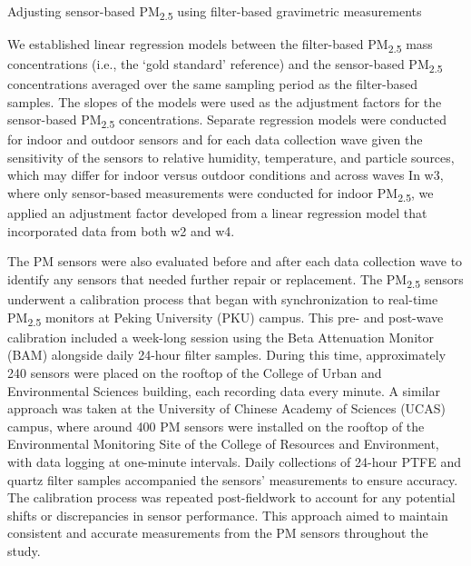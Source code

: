 \documentclass[
  letterpaper,
  DIV=11,
  numbers=noendperiod]{scrartcl}
\makeatletter
\let\oldparagraph\paragraph
\renewcommand{\paragraph}{
    \@ifstar
      \xxxParagraphStar
      \xxxParagraphNoStar
  }
\newcommand{\xxxParagraphStar}[1]{\oldparagraph*{#1}\mbox{}}
\newcommand{\xxxParagraphNoStar}[1]{\oldparagraph{#1}\mbox{}}
\makeatother
\begin{document}
\paragraph{\texorpdfstring{Adjusting sensor-based PM\textsubscript{2.5}
using filter-based gravimetric
measurements}{Adjusting sensor-based PM2.5 using filter-based gravimetric measurements}}\label{adjusting-sensor-based-pm2.5-using-filter-based-gravimetric-measurements}

We established linear regression models between the filter-based
PM\textsubscript{2.5} mass concentrations (i.e., the `gold standard'
reference) and the sensor-based PM\textsubscript{2.5} concentrations
averaged over the same sampling period as the filter-based samples. The
slopes of the models were used as the adjustment factors for the
sensor-based PM\textsubscript{2.5} concentrations. Separate regression
models were conducted for indoor and outdoor sensors and for each data
collection wave given the sensitivity of the sensors to relative
humidity, temperature, and particle sources, which may differ for indoor
versus outdoor conditions and across waves In w3, where only
sensor-based measurements were conducted for indoor
PM\textsubscript{2.5}, we applied an adjustment factor developed from a
linear regression model that incorporated data from both w2 and w4.

The PM sensors were also evaluated before and after each data collection
wave to identify any sensors that needed further repair or replacement.
The PM\textsubscript{2.5} sensors underwent a calibration process that
began with synchronization to real-time PM\textsubscript{2.5} monitors
at Peking University (PKU) campus. This pre- and post-wave calibration
included a week-long session using the Beta Attenuation Monitor (BAM)
alongside daily 24-hour filter samples. During this time, approximately
240 sensors were placed on the rooftop of the College of Urban and
Environmental Sciences building, each recording data every minute. A
similar approach was taken at the University of Chinese Academy of
Sciences (UCAS) campus, where around 400 PM sensors were installed on
the rooftop of the Environmental Monitoring Site of the College of
Resources and Environment, with data logging at one-minute intervals.
Daily collections of 24-hour PTFE and quartz filter samples accompanied
the sensors' measurements to ensure accuracy. The calibration process
was repeated post-fieldwork to account for any potential shifts or
discrepancies in sensor performance. This approach aimed to maintain
consistent and accurate measurements from the PM sensors throughout the
study.
\end{document}
